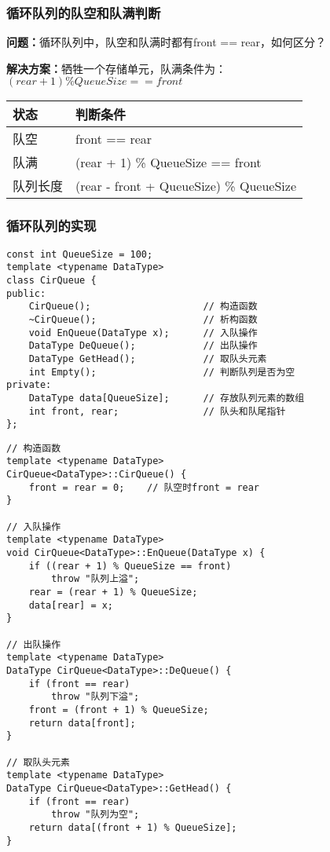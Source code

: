 \documentclass[12pt,a4paper]{amsart}
\begin{document}
\subsubsection{循环队列的队空和队满判断}

\textbf{问题：}循环队列中，队空和队满时都有front == rear，如何区分？

\textbf{解决方案：}牺牲一个存储单元，队满条件为：$(rear + 1) \% QueueSize == front$

\begin{center}
\begin{tabular}{|l|l|}
\hline
\textbf{状态} & \textbf{判断条件} \\
\hline
队空 & front == rear \\
\hline
队满 & (rear + 1) \% QueueSize == front \\
\hline
队列长度 & (rear - front + QueueSize) \% QueueSize \\
\hline
\end{tabular}
\end{center}

\subsubsection{循环队列的实现}

\indent

\begin{lstlisting}[caption=循环队列类定义]
const int QueueSize = 100;
template <typename DataType>
class CirQueue {
public:
    CirQueue();                    // 构造函数
    ~CirQueue();                   // 析构函数
    void EnQueue(DataType x);      // 入队操作
    DataType DeQueue();            // 出队操作
    DataType GetHead();            // 取队头元素
    int Empty();                   // 判断队列是否为空
private:
    DataType data[QueueSize];      // 存放队列元素的数组
    int front, rear;               // 队头和队尾指针
};
\end{lstlisting}

\begin{lstlisting}[caption=循环队列基本操作]
// 构造函数
template <typename DataType>
CirQueue<DataType>::CirQueue() {
    front = rear = 0;    // 队空时front = rear
}

// 入队操作
template <typename DataType>
void CirQueue<DataType>::EnQueue(DataType x) {
    if ((rear + 1) % QueueSize == front) 
        throw "队列上溢";
    rear = (rear + 1) % QueueSize;
    data[rear] = x;
}

// 出队操作
template <typename DataType>
DataType CirQueue<DataType>::DeQueue() {
    if (front == rear) 
        throw "队列下溢";
    front = (front + 1) % QueueSize;
    return data[front];
}

// 取队头元素
template <typename DataType>
DataType CirQueue<DataType>::GetHead() {
    if (front == rear) 
        throw "队列为空";
    return data[(front + 1) % QueueSize];
}
\end{lstlisting}
\end{document}
